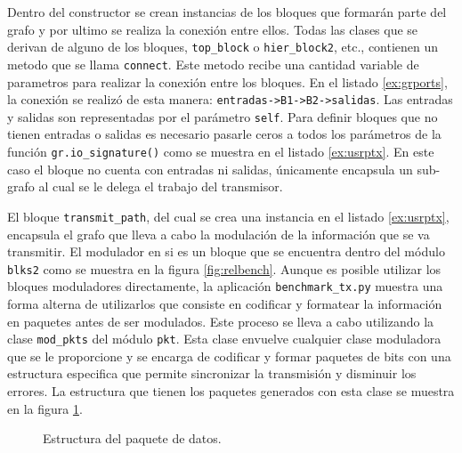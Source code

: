 Dentro del constructor se crean instancias de los bloques que formar\'an parte del grafo y por
ultimo se realiza la conexi\'on entre ellos. Todas las clases que se derivan de alguno de los
bloques, \verb|top_block| o \verb|hier_block2|, etc., contienen un metodo que se llama
\verb|connect|. Este metodo recibe una cantidad variable de parametros para realizar la conexi\'on
entre los bloques. En el listado \ref{ex:grports}, la conexi\'on se realiz\'o de esta manera:
\verb|entradas->B1->B2->salidas|. Las entradas y salidas son representadas por el par\'ametro
\verb|self|. Para definir bloques que no tienen entradas o salidas es necesario pasarle ceros a
todos los par\'ametros de la funci\'on \verb|gr.io_signature()| como se muestra en el listado
\ref{ex:usrptx}. En este caso el bloque no cuenta con entradas ni salidas, \'unicamente encapsula un
sub-grafo al cual se le delega el trabajo del transmisor.

El bloque \verb|transmit_path|, del cual se crea una instancia en el listado \ref{ex:usrptx},
encapsula el grafo que lleva a cabo la modulaci\'on de la informaci\'on que se va transmitir. El
modulador en si es un bloque que se encuentra dentro del m\'odulo \verb|blks2| como se muestra en la
figura \ref{fig:relbench}. Aunque es posible utilizar los bloques moduladores directamente, la
aplicaci\'on \verb|benchmark_tx.py| muestra una forma alterna de utilizarlos que consiste en
codificar y formatear la informaci\'on en paquetes antes de ser modulados. Este proceso se lleva a
cabo utilizando la clase \verb|mod_pkts| del m\'odulo \verb|pkt|. Esta clase envuelve cualquier
clase moduladora que se le proporcione y se encarga de codificar y formar paquetes de bits con una
estructura especifica que permite sincronizar la transmisi\'on y disminuir los errores. La
estructura que tienen los paquetes generados con esta clase se muestra en la figura \ref{fig:packet}.

\begin{figure}[tp]
  \centering
	\vspace{0.3in}
	\caption{Estructura del paquete de datos.}
	\label{fig:packet}
\end{figure}

